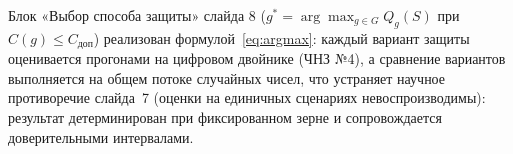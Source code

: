 \documentclass[12pt]{article}
\begin{document}
Блок «Выбор способа защиты» слайда 8 ($g^{*} = \arg\max_{g \in G} Q_g(S)$
при $C(g) \leq C_{\text{доп}}$) реализован формулой~\eqref{eq:argmax}:
каждый вариант защиты оценивается прогонами на цифровом двойнике (ЧНЗ №4),
а сравнение вариантов выполняется на общем потоке случайных чисел, что
устраняет научное противоречие слайда~7 (оценки на единичных сценариях
невоспроизводимы): результат детерминирован при фиксированном зерне и
сопровождается доверительными интервалами.
\end{document}
